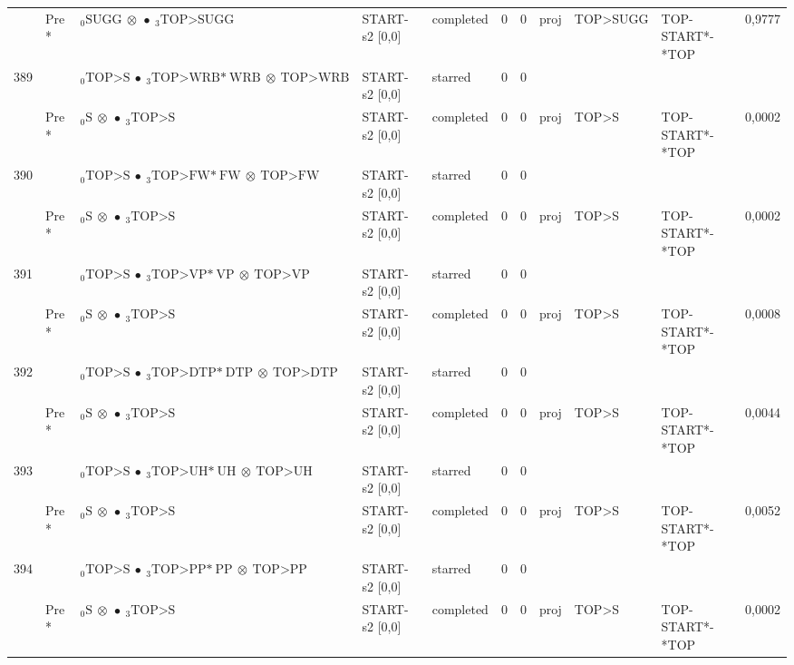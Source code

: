 \documentclass[10pt]{article}
\begin{document}
\begin{longtable}[htbp]{lllllllllll}
 & Pre *& $ {}_0 \textrm{SUGG} \  \otimes \  \bullet \ {}_{3} \textrm{TOP>SUGG} $ & START-s2 [0,0] & completed & 0 & 0 & proj & TOP>SUGG & TOP-START*-*TOP & 0,9777 \\ 
389 & & $ {}_0 \textrm{TOP>S} \  \bullet \ {}_{3} \textrm{TOP>WRB*} \ \textrm{WRB} \  \otimes \ \textrm{TOP>WRB} $ & START-s2 [0,0] & starred & 0 & 0 & & & & \\ 
 & Pre *& $ {}_0 \textrm{S} \  \otimes \  \bullet \ {}_{3} \textrm{TOP>S} $ & START-s2 [0,0] & completed & 0 & 0 & proj & TOP>S & TOP-START*-*TOP & 0,0002 \\ 
390 & & $ {}_0 \textrm{TOP>S} \  \bullet \ {}_{3} \textrm{TOP>FW*} \ \textrm{FW} \  \otimes \ \textrm{TOP>FW} $ & START-s2 [0,0] & starred & 0 & 0 & & & & \\ 
 & Pre *& $ {}_0 \textrm{S} \  \otimes \  \bullet \ {}_{3} \textrm{TOP>S} $ & START-s2 [0,0] & completed & 0 & 0 & proj & TOP>S & TOP-START*-*TOP & 0,0002 \\ 
391 & & $ {}_0 \textrm{TOP>S} \  \bullet \ {}_{3} \textrm{TOP>VP*} \ \textrm{VP} \  \otimes \ \textrm{TOP>VP} $ & START-s2 [0,0] & starred & 0 & 0 & & & & \\ 
 & Pre *& $ {}_0 \textrm{S} \  \otimes \  \bullet \ {}_{3} \textrm{TOP>S} $ & START-s2 [0,0] & completed & 0 & 0 & proj & TOP>S & TOP-START*-*TOP & 0,0008 \\ 
392 & & $ {}_0 \textrm{TOP>S} \  \bullet \ {}_{3} \textrm{TOP>DTP*} \ \textrm{DTP} \  \otimes \ \textrm{TOP>DTP} $ & START-s2 [0,0] & starred & 0 & 0 & & & & \\ 
 & Pre *& $ {}_0 \textrm{S} \  \otimes \  \bullet \ {}_{3} \textrm{TOP>S} $ & START-s2 [0,0] & completed & 0 & 0 & proj & TOP>S & TOP-START*-*TOP & 0,0044 \\ 
393 & & $ {}_0 \textrm{TOP>S} \  \bullet \ {}_{3} \textrm{TOP>UH*} \ \textrm{UH} \  \otimes \ \textrm{TOP>UH} $ & START-s2 [0,0] & starred & 0 & 0 & & & & \\ 
 & Pre *& $ {}_0 \textrm{S} \  \otimes \  \bullet \ {}_{3} \textrm{TOP>S} $ & START-s2 [0,0] & completed & 0 & 0 & proj & TOP>S & TOP-START*-*TOP & 0,0052 \\ 
394 & & $ {}_0 \textrm{TOP>S} \  \bullet \ {}_{3} \textrm{TOP>PP*} \ \textrm{PP} \  \otimes \ \textrm{TOP>PP} $ & START-s2 [0,0] & starred & 0 & 0 & & & & \\ 
 & Pre *& $ {}_0 \textrm{S} \  \otimes \  \bullet \ {}_{3} \textrm{TOP>S} $ & START-s2 [0,0] & completed & 0 & 0 & proj & TOP>S & TOP-START*-*TOP & 0,0002 \\ 

\end{longtable}
\end{document}
